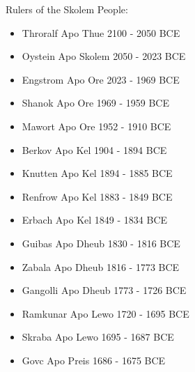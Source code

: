{
  \LARGE
  \normalfont\wedn
Rulers of the Skolem People:

\renewcommand{\labelitemi}{}
\begin{itemize}
\item Throralf Apo Thue 2100 - 2050 BCE
\item Oystein Apo Skolem 2050 - 2023 BCE
\item Engstrom Apo Ore 2023 - 1969 BCE
\item Shanok Apo Ore 1969 - 1959 BCE
\item Mawort Apo Ore 1952 - 1910 BCE
\item Berkov Apo Kel 1904 - 1894 BCE
\item Knutten Apo Kel 1894 - 1885 BCE
\item Renfrow Apo Kel 1883 - 1849 BCE
\item Erbach Apo Kel 1849 - 1834 BCE
\item Guibas Apo Dheub 1830 - 1816 BCE
\item Zabala Apo Dheub 1816 - 1773 BCE
\item Gangolli Apo Dheub 1773 - 1726 BCE
\item Ramkunar Apo Lewo 1720 - 1695 BCE
\item Skraba Apo Lewo 1695 - 1687 BCE
\item Govc Apo Preis 1686 - 1675 BCE
\end{itemize}
}